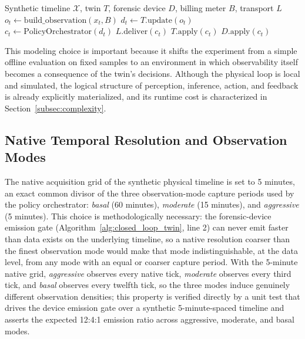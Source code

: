 \documentclass{ieeeaccess}
\begin{document}
\begin{algorithm}[!ht]
\caption{Local closed loop of the digital twin}
\label{alg:closed_loop_twin}
\begin{algorithmic}[1]
\REQUIRE Synthetic timeline $\mathcal{X}$, twin $T$, forensic device $D$, billing meter $B$, transport $L$
        \STATE $o_t \gets \text{build\_observation}(x_t, B)$
        \STATE $d_t \gets T.\text{update}(o_t)$
        \STATE $c_t \gets \text{PolicyOrchestrator}(d_t)$
        \STATE $L.\text{deliver}(c_t)$
        \STATE $T.\text{apply}(c_t)$
        \STATE $D.\text{apply}(c_t)$
    \ENDIF
\ENDFOR
\end{algorithmic}
\end{algorithm}

This modeling choice is important because it shifts the experiment from a simple offline evaluation on fixed samples to an environment in which observability itself becomes a consequence of the twin's decisions. Although the physical loop is local and simulated, the logical structure of perception, inference, action, and feedback is already explicitly materialized, and its runtime cost is characterized in Section~\ref{subsec:complexity}.

\subsection{Native Temporal Resolution and Observation Modes}
\label{subsec:native_resolution}
The native acquisition grid of the synthetic physical timeline is set to 5 minutes, an exact common divisor of the three observation-mode capture periods used by the policy orchestrator: \textit{basal} (60 minutes), \textit{moderate} (15 minutes), and \textit{aggressive} (5 minutes). This choice is methodologically necessary: the forensic-device emission gate (Algorithm~\ref{alg:closed_loop_twin}, line 2) can never emit faster than data exists on the underlying timeline, so a native resolution coarser than the finest observation mode would make that mode indistinguishable, at the data level, from any mode with an equal or coarser capture period. With the 5-minute native grid, \textit{aggressive} observes every native tick, \textit{moderate} observes every third tick, and \textit{basal} observes every twelfth tick, so the three modes induce genuinely different observation densities; this property is verified directly by a unit test that drives the device emission gate over a synthetic 5-minute-spaced timeline and asserts the expected 12:4:1 emission ratio across aggressive, moderate, and basal modes.
\end{document}
